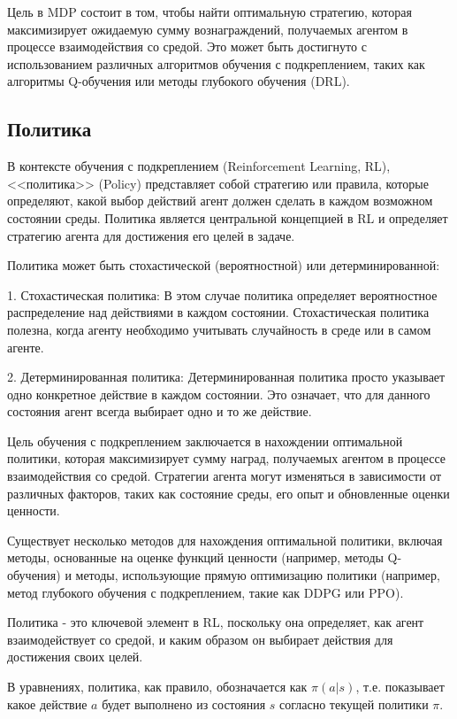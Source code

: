 Цель в MDP состоит в том, чтобы найти оптимальную стратегию, которая максимизирует ожидаемую сумму вознаграждений, получаемых агентом в процессе взаимодействия со средой. Это может быть достигнуто с использованием различных алгоритмов обучения с подкреплением, таких как алгоритмы Q-обучения или методы глубокого обучения (DRL).


\subsection{Политика}
В контексте обучения с подкреплением (Reinforcement Learning, RL), <<политика>> (Policy)
представляет собой стратегию или правила, которые определяют, какой выбор действий агент должен сделать
в каждом возможном состоянии среды.
Политика является центральной концепцией в RL и определяет стратегию агента для достижения его целей в задаче.

Политика может быть стохастической (вероятностной) или детерминированной:

1. Стохастическая политика: В этом случае политика определяет вероятностное распределение над действиями в каждом состоянии. Стохастическая политика полезна, когда агенту необходимо учитывать случайность в среде или в самом агенте.

2. Детерминированная политика: Детерминированная политика просто указывает одно конкретное действие в каждом состоянии. Это означает, что для данного состояния агент всегда выбирает одно и то же действие.

Цель обучения с подкреплением заключается в нахождении оптимальной политики, которая максимизирует сумму наград, получаемых агентом в процессе взаимодействия со средой. Стратегии агента могут изменяться в зависимости от различных факторов, таких как состояние среды, его опыт и обновленные оценки ценности.

Существует несколько методов для нахождения оптимальной политики, включая методы, основанные на оценке функций ценности (например, методы Q-обучения) и методы, использующие прямую оптимизацию политики (например, метод глубокого обучения с подкреплением, такие как DDPG или PPO).

Политика - это ключевой элемент в RL, поскольку она определяет, как агент взаимодействует со средой, и каким образом он выбирает действия для достижения своих целей.

В уравнениях, политика, как правило, обозначается как $\pi(a|s)$, т.е. показывает какое действие $a$ будет выполнено из состояния $s$ согласно текущей политики $\pi$.

